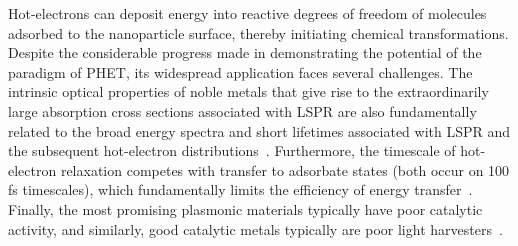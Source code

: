 \documentclass[journal=jpclcd,manuscript=letter]{achemso}
\begin{document}
Hot-electrons can deposit energy into reactive degrees of freedom of molecules adsorbed to the nanoparticle surface, thereby initiating chemical transformations.  Despite the considerable progress made in 
demonstrating the potential of the paradigm of PHET, its widespread application faces several challenges. The intrinsic optical properties of noble metals that give rise to the extraordinarily 
large absorption cross sections associated with LSPR are also fundamentally related to the broad energy spectra and short lifetimes associated with LSPR and the subsequent hot-electron 
distributions~\cite{KS_JCP_1983}. 
Furthermore, the timescale of hot-electron relaxation competes 
with transfer to adsorbate states (both occur on 100 fs timescales), which fundamentally limits the efficiency of energy transfer~\cite{WCM_Science_2015}.  Finally, the most promising plasmonic materials typically have poor catalytic activity, and similarly,
good catalytic metals typically are poor light harvesters~\cite{SZZ_PNAS_2016}.
\end{document}
